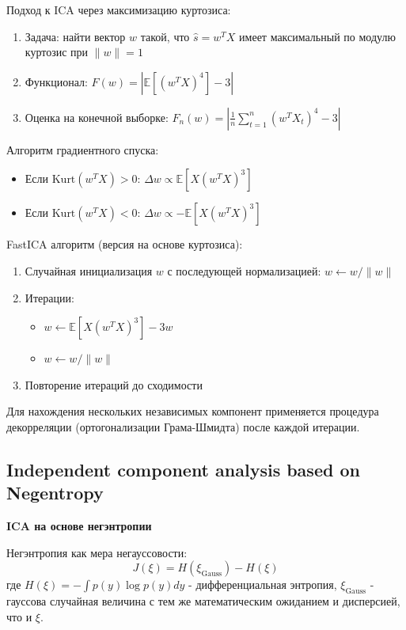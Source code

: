 \documentclass[a4paper,12pt]{article}
\begin{document}
Подход к ICA через максимизацию куртозиса:
\begin{enumerate}
    \item Задача: найти вектор $w$ такой, что $\hat{s} = w^T X$ имеет максимальный по модулю куртозис при $\|w\| = 1$
    \item Функционал: $F(w) = |\mathbb{E}[(w^T X)^4] - 3|$
    \item Оценка на конечной выборке: $F_n(w) = \left|\frac{1}{n}\sum_{t=1}^n (w^T X_t)^4 - 3\right|$
\end{enumerate}

Алгоритм градиентного спуска:
\begin{itemize}
    \item Если $\text{Kurt}(w^T X) > 0$: $\Delta w \propto \mathbb{E}[X (w^T X)^3]$
    \item Если $\text{Kurt}(w^T X) < 0$: $\Delta w \propto -\mathbb{E}[X (w^T X)^3]$
\end{itemize}

FastICA алгоритм (версия на основе куртозиса):
\begin{enumerate}
    \item Случайная инициализация $w$ с последующей нормализацией: $w \leftarrow w/\|w\|$
    \item Итерации:
    \begin{itemize}
        \item $w \leftarrow \mathbb{E}[X(w^T X)^3] - 3w$
        \item $w \leftarrow w/\|w\|$
    \end{itemize}
    \item Повторение итераций до сходимости
\end{enumerate}

Для нахождения нескольких независимых компонент применяется процедура декорреляции (ортогонализации Грама-Шмидта) после каждой итерации.

\subsection{Independent component analysis based on Negentropy}

\textbf{ICA на основе негэнтропии}

Негэнтропия как мера негауссовости:
$$J(\xi) = H(\xi_{\text{Gauss}}) - H(\xi)$$
где $H(\xi) = -\int p(y)\log p(y)dy$ - дифференциальная энтропия, $\xi_{\text{Gauss}}$ - гауссова случайная величина с тем же математическим ожиданием и дисперсией, что и $\xi$.
\end{document}
